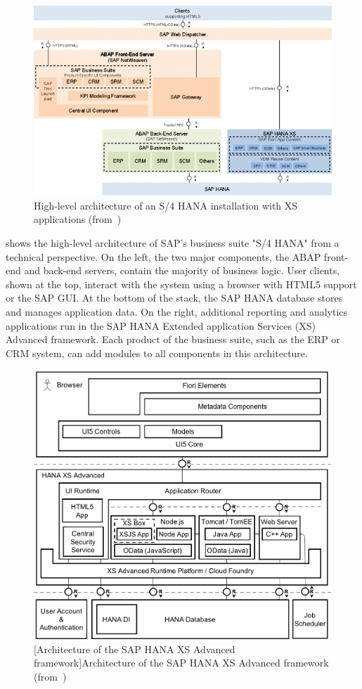 \begin{figure}
  \centering
  \includegraphics[width=.7\textwidth]{img/s4hana}
  \caption[High-level architecture of S/4 HANA]{High-level architecture of an S/4 HANA installation with XS applications (from~\cite{sap17:setup_of_sap_fiori})}
  \label{fig:s4hana}
\end{figure}


 shows the high-level architecture of SAP's business suite "S/4 HANA" from a technical perspective. 
On the left, the two major components, the ABAP front-end and back-end servers, contain the majority of business logic.
User clients, shown at the top, interact with the system using a browser with HTML5 support or the SAP GUI.
At the bottom of the stack, the SAP HANA database stores and manages application data.
On the right, additional reporting and analytics applications run in the SAP HANA Extended application Services (XS) Advanced framework.
Each product of the business suite, such as the ERP or CRM system, can add modules to all components in this architecture.

\begin{figure}
  \centering
  \includegraphics[width=.5\textwidth]{img/xsa}
  [Architecture of the SAP HANA XS Advanced framework]{Architecture of the SAP HANA XS Advanced framework (from~\cite{subatin17:xs_advanced_for_not})}
  \label{fig:xsa}
\end{figure}

